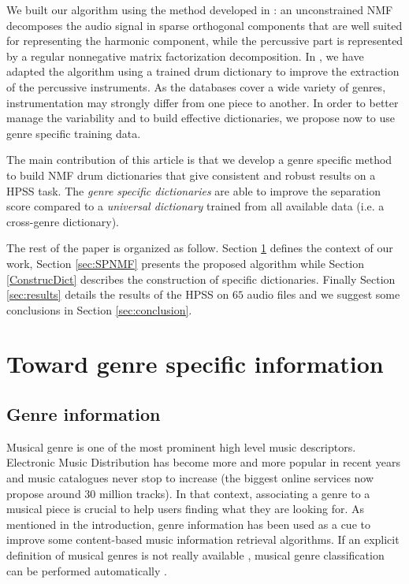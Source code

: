 \documentclass{article}
\begin{document}
We built our algorithm using the method developed in \cite{laroche2015structuredhidden}: an unconstrained NMF decomposes the audio signal in sparse orthogonal components that are well suited for representing the harmonic component, while the percussive part is represented by a regular nonnegative matrix factorization decomposition. In \cite{larocheJournalhidden}, we have adapted the algorithm using a trained drum dictionary to improve the extraction of the percussive instruments. As the databases cover a wide variety of genres, instrumentation may strongly differ from one piece to another. In order to better manage the variability and to build effective dictionaries, we propose now to use genre specific training data.

The main contribution of this article is that we develop a genre specific method to build NMF drum dictionaries that give consistent and robust results on a HPSS task. The \emph{genre specific dictionaries} are able to improve the separation score compared to a \emph{universal dictionary} trained from all available data (i.e. a cross-genre dictionary). 


The rest of the paper is organized as follow. Section \ref{defgenre} defines the context of our work, Section \ref{sec:SPNMF} presents the proposed algorithm while Section \ref{ConstrucDict} describes the construction of specific dictionaries. Finally Section \ref{sec:results} details the results of the HPSS on $65$ audio files and  we suggest some conclusions in Section \ref{sec:conclusion}. 



\section{Toward genre specific information}\label{defgenre}

\subsection{Genre information}

Musical genre is one of the most prominent high level music descriptors. Electronic Music Distribution has become more and more popular in recent years and music catalogues never stop to increase (the biggest online services now propose around 30 million tracks). In that context, associating a genre to a musical piece is crucial to help users finding what they are looking for. As mentioned in the introduction, genre information has been used as a cue to improve some content-based music information retrieval algorithms. If an explicit definition of musical genres is not really available \cite{aucouturier2003representing}, musical genre classification can be performed automatically \cite{li2003comparative}. %
\end{document}

